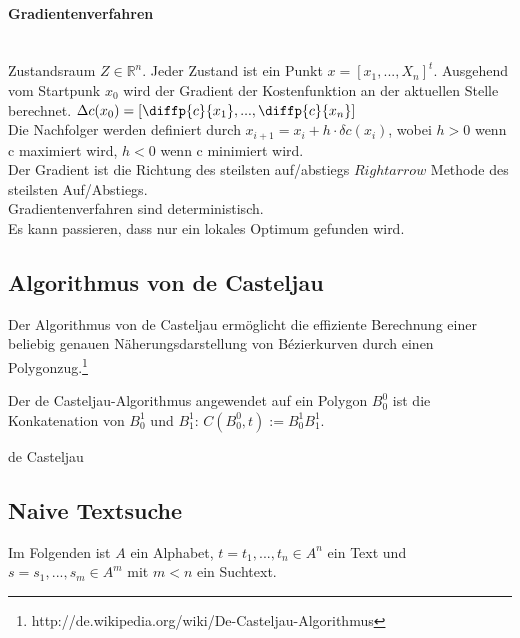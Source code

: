 \paragraph{Gradientenverfahren}
\text{ }\\Zustandsraum $Z \in \mathbb{R}^n$. Jeder Zustand ist ein Punkt $x = [x_1, ... , X_n]^t$.
Ausgehend vom Startpunk $x_0$ wird der Gradient der Kostenfunktion an der aktuellen Stelle berechnet. 
$\Delta c(x_0) = \left[ \diffp{c}{{x_{1}}}, ... , \diffp{c}{{x_{n}}} \right]$\\
Die Nachfolger werden definiert durch $x_{i+1} = x_i + h \cdot \delta c(x_i)$, wobei $h > 0$ wenn c maximiert wird, $h < 0$ wenn c minimiert wird.\\
Der Gradient ist die Richtung des steilsten auf/abstiegs $Rightarrow$ Methode des steilsten Auf/Abstiegs.\\
Gradientenverfahren sind deterministisch.\\
Es kann passieren, dass nur ein lokales Optimum gefunden wird.\\

\subsection{Algorithmus von de Casteljau}
Der Algorithmus von de Casteljau ermöglicht die effiziente Berechnung einer beliebig genauen Näherungsdarstellung von Bézierkurven durch einen Polygonzug.\footnote{http://de.wikipedia.org/wiki/De-Casteljau-Algorithmus}

Der de Casteljau-Algorithmus angewendet auf ein Polygon \(B_0^0\) ist die Konkatenation von \(B_0^1\) und \(B_1^1\): \(C(B_0^0,t) := B_0^1 B_1^1\).

\begin{algorithm}[H]
	\caption{de Casteljau}

	\BlankLine

\end{algorithm}


\subsection{Naive Textsuche}
Im Folgenden ist \(A\) ein Alphabet, \(t = t_1,...,t_n \in A^n\) ein Text und \(s = s_1,...,s_m \in A^m\) mit \(m<n\) ein Suchtext.

